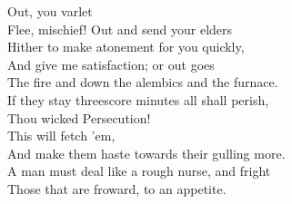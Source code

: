 \documentclass[a4paper,oneside,12pt]{memoir}
\begin{document}
\begin{drama*}
\subtlespeaks {} Out, you varlet\\
Flee, mischief! Out and send your elders\\
Hither to make atonement for you quickly,\\
And give me satisfaction; or out goes\\
The fire and down the alembics and the furnace.\\
If they stay threescore minutes all shall perish,\\
Thou wicked Persecution!\\
 This will fetch 'em,\\
And make them haste towards their gulling more.\\
A man must deal like a rough nurse, and fright\\
Those that are froward, to an appetite.\\

\scene


\end{drama*}
\end{document}
